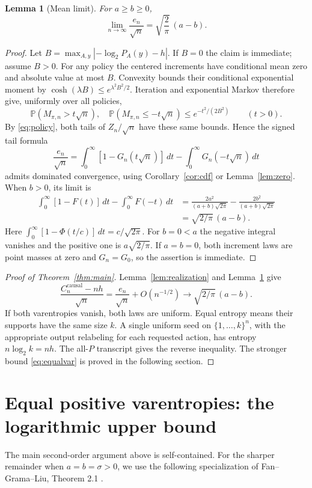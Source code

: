 \documentclass[11pt,a4paper]{article}
\newtheorem{lemma}[theorem]{Lemma}
\newcommand{\Prob}{\mathbb P}
\newcommand{\causal}{\mathrm{causal}}
\begin{document}
\begin{lemma}[Mean limit]\label{lem:mean}
For $a\ge b\ge0$,
\begin{equation}\label{eq:mean}
\lim_{n\to\infty}\frac{e_n}{\sqrt n}
=\sqrt{\frac2\pi}\,(a-b).
\end{equation}
\end{lemma}
\begin{proof}
Let $B=\max_{A,y}|-\log_2P_A(y)-h|$. If $B=0$ the claim is immediate;
assume $B>0$. For any policy the centered
increments have conditional mean zero and absolute value at most $B$.
Convexity bounds their conditional exponential moment by
$\cosh(\lambda B)\le e^{\lambda^2B^2/2}$. Iteration and exponential
Markov therefore give, uniformly over all policies,
\[
\Prob(M_{\pi,n}>t\sqrt n),\quad
\Prob(M_{\pi,n}\le-t\sqrt n)
\le e^{-t^2/(2B^2)}\qquad(t>0).
\]
By \eqref{eq:policy}, both tails of $Z_n/\sqrt n$ have these same
bounds. Hence the signed tail formula
\[
\frac{e_n}{\sqrt n}
=\int_0^\infty[1-G_n(t\sqrt n)]\,dt
-\int_0^\infty G_n(-t\sqrt n)\,dt
\]
admits dominated convergence, using Corollary~\ref{cor:cdf} or
Lemma~\ref{lem:zero}. When $b>0$, its limit is
\begin{align*}
\int_0^\infty[1-F(t)]\,dt-\int_0^\infty F(-t)\,dt
&=\frac{2a^2}{(a+b)\sqrt{2\pi}}
-\frac{2b^2}{(a+b)\sqrt{2\pi}}\\
&=\sqrt{2/\pi}\,(a-b).
\end{align*}
Here $\int_0^\infty[1-\Phi(t/c)]\,dt=c/\sqrt{2\pi}$.
For $b=0<a$ the negative integral vanishes and the positive one is
$a\sqrt{2/\pi}$. If $a=b=0$, both increment laws are point masses
at zero and $G_n=G_0$, so the assertion is immediate.
\end{proof}

\begin{proof}[Proof of Theorem~\ref{thm:main}]
Lemma~\ref{lem:realization} and Lemma~\ref{lem:mean} give
\[
\frac{C_n^{\causal}-nh}{\sqrt n}
=\frac{e_n}{\sqrt n}+O(n^{-1/2})
\longrightarrow\sqrt{2/\pi}\,(a-b).
\]
If both varentropies vanish, both laws are uniform. Equal entropy means
their supports have the same size $k$. A single uniform seed on
$\{1,\ldots,k\}^n$, with the appropriate output relabeling for each
requested action, has entropy $n\log_2k=nh$. The all-$P$ transcript
gives the reverse inequality.
The stronger bound \eqref{eq:equalvar} is proved in the following section.
\end{proof}

\section{Equal positive varentropies: the logarithmic upper bound}
The main second-order argument above is self-contained. For the sharper
remainder when $a=b=\sigma>0$, we use the following specialization of
Fan--Grama--Liu, Theorem 2.1 \cite{FGL}.
\end{document}
